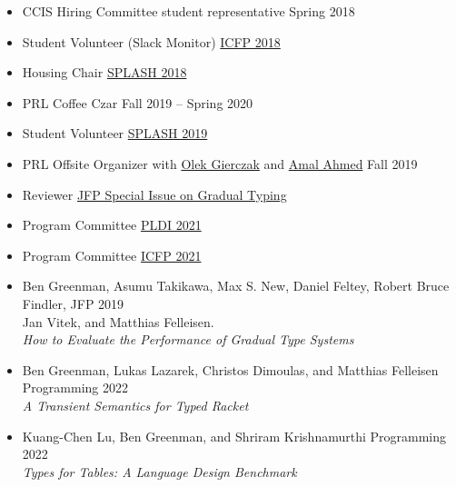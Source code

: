\documentclass{article}
\begin{document}
\begin{itemize}
  \item {CCIS Hiring Committee student representative} \hfill {Spring 2018}
  \item {Student Volunteer (Slack Monitor)} \hfill \href{https://icfp18.sigplan.org/committee/icfp-2018-organizing-committee}{ICFP 2018}
  \item {Housing Chair} \hfill \href{https://2018.splashcon.org/committee/splash-2018-organizing-committee}{SPLASH 2018}
  \item {PRL Coffee Czar} \hfill {Fall 2019 -- Spring 2020}
  \item {Student Volunteer} \hfill \href{https://2019.splashcon.org/}{SPLASH 2019}
  \item {PRL Offsite Organizer} with \href{https://www.khoury.northeastern.edu/people/olek-gierczak/}{Olek Gierczak} and \href{http://ccs.neu.edu/home/amal/}{Amal Ahmed} \hfill {Fall 2019}
  \item {Reviewer} \hfill \href{https://www.cambridge.org/core/news/jfp-special-issue-on-gradual-typing}{JFP Special Issue on Gradual Typing}
  \item {Program Committee} \hfill \href{https://pldi21.sigplan.org/committee/pldi-2021-papers-program-committee}{PLDI 2021}
  \item {Program Committee} \hfill \href{https://icfp21.sigplan.org/committee/icfp-2021-papers-program-committee}{ICFP 2021}
\end{itemize}




\begin{itemize}
\item
  Ben Greenman, Asumu Takikawa, Max S. New, Daniel Feltey, Robert Bruce Findler, \hfill JFP 2019 \\
  Jan Vitek, and Matthias Felleisen. \\
  \emph{How to Evaluate the Performance of Gradual Type Systems}
\item
  Ben Greenman, Lukas Lazarek, Christos Dimoulas, and Matthias Felleisen \hfill Programming 2022 \\
  \emph{A Transient Semantics for Typed Racket}
\item
  Kuang-Chen Lu, Ben Greenman, and Shriram Krishnamurthi \hfill Programming 2022 \\
  \emph{Types for Tables: A Language Design Benchmark}
\end{itemize}
\end{document}
